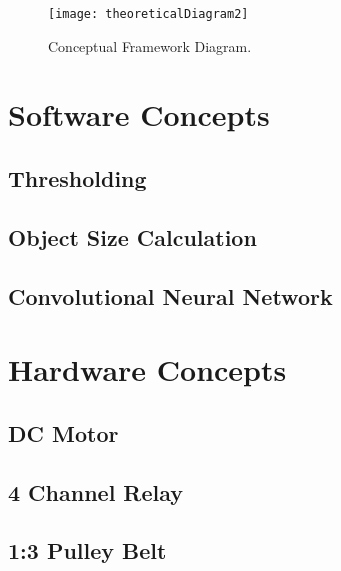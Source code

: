 \begin{figure}[!htbp]
	\centering
	\texttt{[image: theoreticalDiagram2]}
	\caption{Conceptual Framework Diagram.}
	\label{fig:theoreticalDiagram2}
\end{figure}

\section{Software Concepts}

\subsection{Thresholding}

\subsection{Object Size Calculation}

\subsection{Convolutional Neural Network}

\section{Hardware Concepts}

\subsection{DC Motor}

\subsection{4 Channel Relay}

\subsection{1:3 Pulley Belt}


